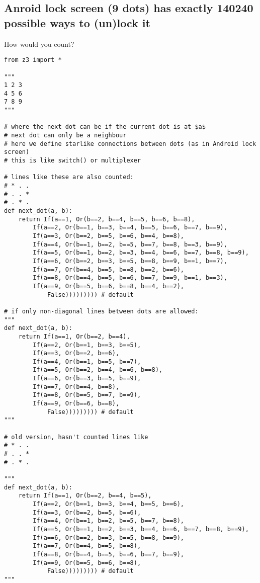 \subsection{Anroid lock screen (9 dots) has exactly 140240 possible ways to (un)lock it}

How would you count?

\begin{lstlisting}
from z3 import *

"""
1 2 3
4 5 6
7 8 9
"""

# where the next dot can be if the current dot is at $a$
# next dot can only be a neighbour
# here we define starlike connections between dots (as in Android lock screen)
# this is like switch() or multiplexer

# lines like these are also counted:
# * . .
# . . *
# . * .
def next_dot(a, b):
    return If(a==1, Or(b==2, b==4, b==5, b==6, b==8),
        If(a==2, Or(b==1, b==3, b==4, b==5, b==6, b==7, b==9),
        If(a==3, Or(b==2, b==5, b==6, b==4, b==8),
        If(a==4, Or(b==1, b==2, b==5, b==7, b==8, b==3, b==9),
        If(a==5, Or(b==1, b==2, b==3, b==4, b==6, b==7, b==8, b==9),
        If(a==6, Or(b==2, b==3, b==5, b==8, b==9, b==1, b==7),
        If(a==7, Or(b==4, b==5, b==8, b==2, b==6),
        If(a==8, Or(b==4, b==5, b==6, b==7, b==9, b==1, b==3),
        If(a==9, Or(b==5, b==6, b==8, b==4, b==2),
            False))))))))) # default

# if only non-diagonal lines between dots are allowed:
"""
def next_dot(a, b):
    return If(a==1, Or(b==2, b==4),
        If(a==2, Or(b==1, b==3, b==5),
        If(a==3, Or(b==2, b==6),
        If(a==4, Or(b==1, b==5, b==7),
        If(a==5, Or(b==2, b==4, b==6, b==8),
        If(a==6, Or(b==3, b==5, b==9),
        If(a==7, Or(b==4, b==8),
        If(a==8, Or(b==5, b==7, b==9),
        If(a==9, Or(b==6, b==8),
            False))))))))) # default
"""

# old version, hasn't counted lines like
# * . .
# . . *
# . * .

"""
def next_dot(a, b):
    return If(a==1, Or(b==2, b==4, b==5),
        If(a==2, Or(b==1, b==3, b==4, b==5, b==6),
        If(a==3, Or(b==2, b==5, b==6),
        If(a==4, Or(b==1, b==2, b==5, b==7, b==8),
        If(a==5, Or(b==1, b==2, b==3, b==4, b==6, b==7, b==8, b==9),
        If(a==6, Or(b==2, b==3, b==5, b==8, b==9),
        If(a==7, Or(b==4, b==5, b==8),
        If(a==8, Or(b==4, b==5, b==6, b==7, b==9),
        If(a==9, Or(b==5, b==6, b==8),
            False))))))))) # default
"""


\end{lstlisting}
